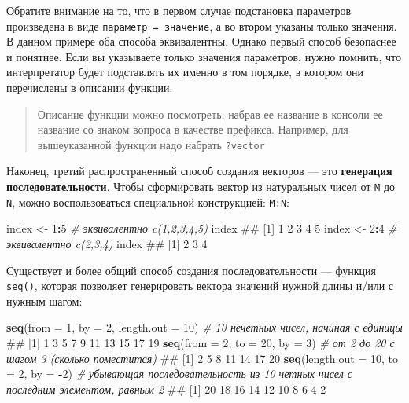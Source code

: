 \documentclass[]{book}
\newenvironment{Shaded}{\begin{snugshade}}{\end{snugshade}}
\newcommand{\KeywordTok}[1]{\textcolor[rgb]{0.13,0.29,0.53}{\textbf{#1}}}
\newcommand{\DataTypeTok}[1]{\textcolor[rgb]{0.13,0.29,0.53}{#1}}
\newcommand{\DecValTok}[1]{\textcolor[rgb]{0.00,0.00,0.81}{#1}}
\newcommand{\StringTok}[1]{\textcolor[rgb]{0.31,0.60,0.02}{#1}}
\newcommand{\CommentTok}[1]{\textcolor[rgb]{0.56,0.35,0.01}{\textit{#1}}}
\newcommand{\OperatorTok}[1]{\textcolor[rgb]{0.81,0.36,0.00}{\textbf{#1}}}
\newcommand{\NormalTok}[1]{#1}
\begin{document}
Обратите внимание на то, что в первом случае подстановка параметров
произведена в виде \texttt{параметр\ =\ значение}, а во втором указаны
только значения. В данном примере оба способа эквивалентны. Однако
первый способ безопаснее и понятнее. Если вы указываете только значения
параметров, нужно помнить, что интерпретатор будет подставлять их именно
в том порядке, в котором они перечислены в описании функции.

\begin{quote}
Описание функции можно посмотреть, набрав ее название в консоли ее
название со знаком вопроса в качестве префикса. Например, для
вышеуказанной функции надо набрать \texttt{?vector}
\end{quote}

Наконец, третий распространенный способ создания векторов --- это
\textbf{генерация последовательности}. Чтобы сформировать вектор из
натуральных чисел от \texttt{M} до \texttt{N}, можно воспользоваться
специальной конструкцией: \texttt{M:N}:

\begin{Shaded}
\begin{Highlighting}[]
\NormalTok{index <-}\StringTok{ }\DecValTok{1}\OperatorTok{:}\DecValTok{5} \CommentTok{# эквивалентно c(1,2,3,4,5)}
\NormalTok{index}
\NormalTok{## [1] 1 2 3 4 5}
\NormalTok{index <-}\StringTok{ }\DecValTok{2}\OperatorTok{:}\DecValTok{4} \CommentTok{# эквивалентно c(2,3,4)}
\NormalTok{index}
\NormalTok{## [1] 2 3 4}
\end{Highlighting}
\end{Shaded}

Существует и более общий способ создания последовательности --- функция
\texttt{seq()}, которая позволяет генерировать вектора значений нужной
длины и/или с нужным шагом:

\begin{Shaded}
\begin{Highlighting}[]
\KeywordTok{seq}\NormalTok{(}\DataTypeTok{from =} \DecValTok{1}\NormalTok{, }\DataTypeTok{by =} \DecValTok{2}\NormalTok{, }\DataTypeTok{length.out =} \DecValTok{10}\NormalTok{) }\CommentTok{# 10 нечетных чисел, начиная с единицы}
\NormalTok{##  [1]  1  3  5  7  9 11 13 15 17 19}
\KeywordTok{seq}\NormalTok{(}\DataTypeTok{from =} \DecValTok{2}\NormalTok{, }\DataTypeTok{to =} \DecValTok{20}\NormalTok{, }\DataTypeTok{by =} \DecValTok{3}\NormalTok{) }\CommentTok{# от 2 до 20 с шагом 3 (сколько поместится)}
\NormalTok{## [1]  2  5  8 11 14 17 20}
\KeywordTok{seq}\NormalTok{(}\DataTypeTok{length.out =} \DecValTok{10}\NormalTok{, }\DataTypeTok{to =} \DecValTok{2}\NormalTok{, }\DataTypeTok{by =} \OperatorTok{-}\DecValTok{2}\NormalTok{) }\CommentTok{# убывающая последовательность из 10 четных чисел с последним элементом, равным 2}
\NormalTok{##  [1] 20 18 16 14 12 10  8  6  4  2}
\end{Highlighting}
\end{Shaded}
\end{document}
